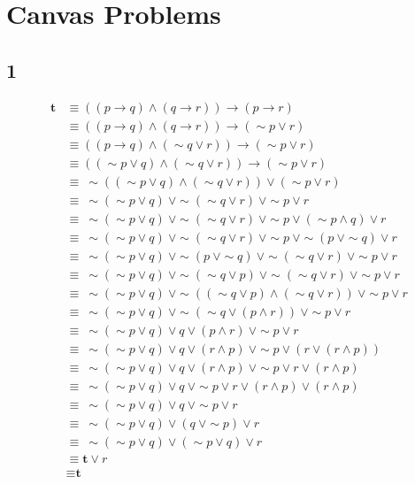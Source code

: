 \documentclass[12pt]{article}
\begin{document}
\section*{Canvas Problems}

\subsection*{1}

\begin{align*}
  \textbf{t} &\equiv ((p \rightarrow q) \wedge (q \rightarrow r)) \rightarrow (p \rightarrow r) \\
  &\equiv ((p \rightarrow q) \wedge (q \rightarrow r)) \rightarrow (\sim p \vee r) \\
  &\equiv ((p \rightarrow q) \wedge (\sim q \vee r)) \rightarrow (\sim p \vee r) \\
  &\equiv ((\sim p \vee q) \wedge (\sim q \vee r)) \rightarrow (\sim p \vee r) \\
  &\equiv \ \sim((\sim p \vee q) \wedge (\sim q \vee r)) \vee (\sim p \vee r) \\
  &\equiv \ \sim(\sim p \vee q) \ \vee \sim (\sim q \vee r)\ \vee \sim p \vee r \\
  &\equiv \ \sim(\sim p \vee q) \ \vee \sim (\sim q \vee r)\ \vee \sim p \vee (\sim p \wedge q) \vee r \\
  &\equiv \ \sim(\sim p \vee q) \ \vee \sim (\sim q \vee r)\ \vee \sim p \ \vee \sim (p \ \vee \sim q)\vee r \\
  &\equiv \ \sim(\sim p \vee q) \ \vee \sim (p \ \vee \sim q) \ \vee \sim (\sim q \vee r)\ \vee \sim p \vee r \\
  &\equiv \ \sim(\sim p \vee q) \ \vee \sim (\sim q \vee p) \ \vee \sim (\sim q \vee r)\ \vee \sim p \vee r \\
  &\equiv \ \sim(\sim p \vee q) \ \vee \sim ((\sim q \vee p) \wedge (\sim q \vee r))\ \vee \sim p \vee r \\
  &\equiv \ \sim(\sim p \vee q) \ \vee \sim (\sim q \vee (p \wedge r))\ \vee \sim p \vee r \\
  &\equiv \ \sim(\sim p \vee q) \vee q \vee (p \wedge r)\ \vee \sim p \vee r \\
  &\equiv \ \sim(\sim p \vee q) \vee q \vee (r \wedge p)\ \vee \sim p \vee (r \vee (r \wedge p)) \\
  &\equiv \ \sim(\sim p \vee q) \vee q \vee (r \wedge p)\ \vee \sim p \vee r \vee (r \wedge p) \\
  &\equiv \ \sim(\sim p \vee q) \vee q \ \vee \sim p \vee r \vee (r \wedge p) \vee (r \wedge p)\ \\
  &\equiv \ \sim(\sim p \vee q) \vee q \ \vee \sim p \vee r \\
  &\equiv \ \sim(\sim p \vee q) \vee (q \ \vee \sim p) \vee r \\
  &\equiv \ \sim(\sim p \vee q) \vee (\sim p \vee q) \vee r \\
  &\equiv \textbf{t} \vee r \\
  &\equiv \textbf{t} \\
\end{align*}
\end{document}
